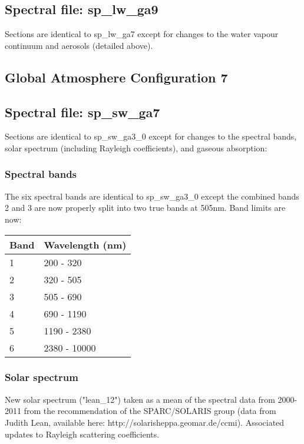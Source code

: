 \subsection*{Spectral file: sp\_lw\_ga9}

Sections are identical to sp\_lw\_ga7 except for changes to the water vapour continuum and aerosols (detailed above).

\subsection{Global Atmosphere Configuration 7}

\subsection*{Spectral file: sp\_sw\_ga7}

Sections are identical to sp\_sw\_ga3\_0 except for changes to the spectral bands, solar spectrum (including Rayleigh coefficients), and gaseous absorption:


\subsubsection*{Spectral bands}

The six spectral bands are identical to sp\_sw\_ga3\_0 except the combined bands 2 and 3 are now properly split into two true bands at 505nm. Band limits are now:

\begin{tabular}{l|l}
Band & Wavelength (nm)\\ \hline
1 & 200 - 320\\
2 & 320 - 505\\
3 & 505 - 690\\
4 & 690 - 1190\\
5 & 1190 - 2380\\
6 & 2380 - 10000\\
\end{tabular}


\subsubsection*{Solar spectrum}

New solar spectrum ("lean\_12") taken as a mean of the spectral data from 2000-2011 from the recommendation of the SPARC/SOLARIS group (data from Judith Lean, available here: http://solarisheppa.geomar.de/ccmi). Associated updates to Rayleigh scattering coefficients. 

